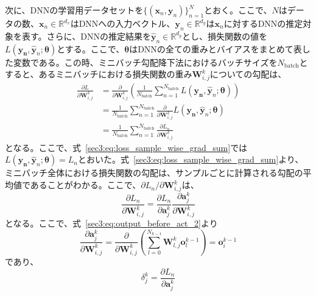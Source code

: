 \documentclass[12pt]{jarticle}
\numberwithin{equation}{section}    %
\numberwithin{figure}{section}      %
\numberwithin{table}{section}      %
\begin{document}
次に、DNNの学習用データセットを$\{(\bm{x}_{n}, \bm{y}_{n})\}_{n = 1}^{N}$とおく。ここで、$N$はデータの数、$\bm{x}_{n} \in \mathbb{R}^{d_{x}}$はDNNへの入力ベクトル、$\bm{y}_{n} \in \mathbb{R}^{d_{y}}$は$\bm{x}_{n}$に対するDNNの推定対象を表す。さらに、DNNの推定結果を$\hat{\bm{y}}_{n} \in \mathbb{R}^{d_{y}}$とし、損失関数の値を$L(\bm{y_{n}}, \hat{\bm{y}}_{n} ; \bm{\theta})$とする。ここで、$\bm{\theta}$はDNNの全ての重みとバイアスをまとめて表した変数である。この時、ミニバッチ勾配降下法におけるバッチサイズを$N_{\text{batch}}$とすると、あるミニバッチにおける損失関数の重み$\bm{W}_{i, j}^{k}$についての勾配は、
\begin{align}
    \frac{\partial L}{\partial \bm{W}_{i, j}^{k}} & = \frac{\partial}{\partial \bm{W}_{i, j}^{k}} \left(\frac{1}{N_{\text{batch}}} \sum_{n = 1}^{N_{\text{batch}}} L(\bm{y_{n}}, \hat{\bm{y}}_{n}; \bm{\theta})\right) \\
                                                  & = \frac{1}{N_{\text{batch}}} \sum_{n = 1}^{N_{\text{batch}}} \frac{\partial}{\partial \bm{W}_{i, j}^{k}} L(\bm{y_{n}}, \hat{\bm{y}}_{n}; \bm{\theta})              \\
                                                  & = \frac{1}{N_{\text{batch}}} \sum_{n = 1}^{N_{\text{batch}}} \frac{\partial L_{n}}{\partial \bm{W}_{i, j}^{k}} \label{sec3:eq:loss_sample_wise_grad_sum}
\end{align}
となる。ここで、式~\eqref{sec3:eq:loss_sample_wise_grad_sum}では$L(\bm{y_{n}}, \hat{\bm{y}}_{n}; \bm{\theta}) = L_{n}$とおいた。式~\eqref{sec3:eq:loss_sample_wise_grad_sum}より、ミニバッチ全体における損失関数の勾配は、サンプルごとに計算される勾配の平均値であることがわかる。ここで、$\partial L_{n} / \partial \bm{W}_{i, j}^{k}$は、
\begin{equation}
    \label{sec3:eq:loss_sample_wise_grad}
    \frac{\partial L_{n}}{\partial \bm{W}_{i, j}^{k}} = \frac{\partial L_{n}}{\partial \bm{a}_{j}^{k}} \frac{\partial \bm{a}_{j}^{k}}{\partial \bm{W}_{i, j}^{k}}
\end{equation}
となる。ここで、式~\eqref{sec3:eq:output_before_act_2}より
\begin{equation}
    \frac{\partial \bm{a}_{j}^{k}}{\partial \bm{W}_{i, j}^{k}} = \frac{\partial}{\partial \bm{W}_{i, j}^{k}} \left( \sum_{l = 0}^{N_{k - 1}} \bm{W}_{l, j}^{k} \bm{o}_{l}^{k - 1} \right) = \bm{o}_{i}^{k - 1}
\end{equation}
であり、
\begin{equation}
    \delta_{j}^{k} = \frac{\partial L_{n}}{\partial \bm{a}_{j}^{k}}
\end{equation}
\end{document}
